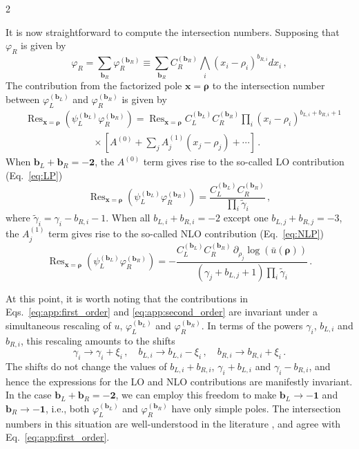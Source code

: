 \documentclass[fleqn]{2023SCGE}
\newcommand{\nn}{\nonumber}
\DeclareMathOperator{\Res}{Res}
\begin{document}
\begin{multicols}{2}
\begin{appendix}
It is now straightforward to compute the intersection numbers. Supposing that $\varphi_R$ is given by
\begin{equation}
\varphi_R = \sum_{\bm{b}_R} \varphi_R^{(\bm{b}_R)} \equiv \sum_{\bm{b}_R} C_R^{(\bm{b}_R)} \bigwedge_i \left( x_i - \rho_i \right)^{b_{R,i}} dx_i \, ,
\end{equation}
The contribution from the factorized pole $\bm{x} = \bm{\rho}$ to the intersection number between $\varphi_L^{(\bm{b}_L)}$ and $\varphi_R^{(\bm{b}_R)}$ is given by
\begin{align}
    &\Res_{\bm{x} = \bm{\rho}} \left( \psi_L^{(\bm{b}_L)} \varphi_R^{(\bm{b}_R)} \right) = \Res_{\bm{x} = \bm{\rho}} C_L^{(\bm{b}_L)} C_R^{(\bm{b}_R)} \prod_i (x_i-\rho_i)^{b_{L,i} + b_{R,i} + 1} \nn\\
    &\quad \quad \quad\quad \quad\quad \quad \times\left[ A^{(0)} + \sum_j A^{(1)}_j (x_j - \rho_j) + \cdots \right]  \, .
\end{align}
When $\bm{b}_L + \bm{b}_R = \bm{-2}$, the $A^{(0)}$ term gives rise to the so-called LO contribution (Eq.~\eqref{eq:LP})
\begin{equation}
    \Res_{\bm{x} = \bm{\rho}} \left( \psi_L^{(\bm{b}_L)} \varphi_R^{(\bm{b}_R)} \right) =  \frac{C_L^{(\bm{b}_L)} C_R^{(\bm{b}_R)}}{\prod_i \tilde{\gamma}_i} \,,
    \label{eq:app:first_order}
\end{equation}
where $\tilde{\gamma}_i = \gamma_i - b_{R,i} - 1$. When all $b_{L,i}+b_{R,i} = -2$ except one $b_{L,j}+b_{R,j}=-3$, the $A^{(1)}_j$ term gives rise to the so-called NLO contribution (Eq.~\eqref{eq:NLP})
\begin{equation}
    \Res_{\bm{x} = \bm{\rho}} \left( \psi_L^{(\bm{b}_L)} \varphi_R^{(\bm{b}_R)} \right) =  - \frac{C_L^{(\bm{b}_L)} C_R^{(\bm{b}_R)} \, \partial_{\rho_j} \log(\bar{u}(\bm{\rho})) }{(\gamma_j+b_{L,j}+1) \prod_i \tilde{\gamma}_i}  \,.
    \label{eq:app:second_order}
\end{equation}

At this point, it is worth noting that the contributions in Eqs.~\eqref{eq:app:first_order} and \eqref{eq:app:second_order} are invariant under a simultaneous rescaling of $u$, $\varphi_L^{(\bm{b}_L)}$ and $\varphi_R^{(\bm{b}_R)}$. In terms of the powers $\gamma_i$, $b_{L,i}$ and $b_{R,i}$, this rescaling amounts to the shifts
\begin{equation}
    \gamma_i \to \gamma_i + \xi_i \, , \quad b_{L,i} \to b_{L,i} - \xi_i \, , \quad b_{R,i} \to b_{R,i} + \xi_i \,.
\end{equation}
The shifts do not change the values of $b_{L,i}+b_{R,i}$, $\gamma_i + b_{L,i}$ and $\gamma_i - b_{R,i}$, and hence the expressions for the LO and NLO contributions are manifestly invariant. In the case $\bm{b}_L + \bm{b}_R = \bm{-2}$, we can employ this freedom to make $\bm{b}_L \to \bm{-1}$ and $\bm{b}_R \to \bm{-1}$, i.e., both $\varphi_L^{(\bm{b}_L)}$ and $\varphi_R^{(\bm{b}_R)}$ have only simple poles. The intersection numbers in this situation are well-understood in the literature \cite{Mizera:2019ose}, and agree with Eq.~\eqref{eq:app:first_order}.


\end{appendix}
\end{multicols}
\end{document}
